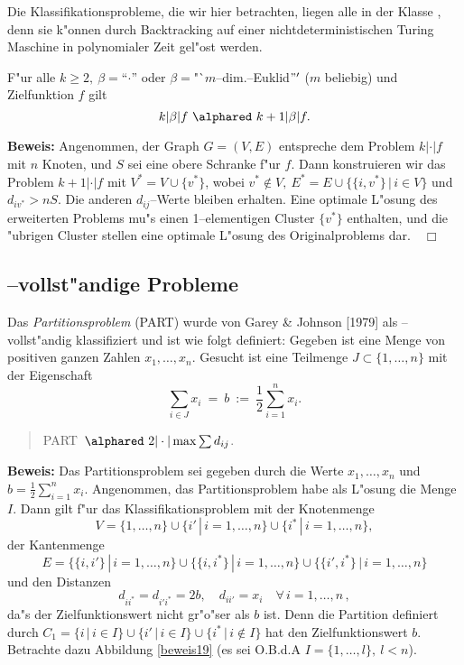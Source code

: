 Die Klassifikationsprobleme, die wir hier betrachten, liegen alle in der
Klasse \NP, denn sie k"onnen durch Backtracking auf
einer nichtdeterministischen Turing Maschine in  polynomialer Zeit
gel"ost werden.

\begin{satz}
	F"ur alle $k \geq 2, \ \beta =$"`$\cdot$"' oder 
	$\beta=$"`$m$--dim.--Euklid$"'$ ($m$ beliebig) und Zielfunktion $f$ gilt
		\[  k | \beta |f \ \alphared\  k+1|\beta|f. \]
\end{satz}
{\bf Beweis:}
Angenommen, der Graph $G=(V,E)$ entspreche dem Problem $k|\cdot|f$ mit
$n$ Knoten, und $S$ sei eine obere Schranke f"ur $f$. Dann konstruieren
wir das Problem $k+1 | \cdot | f$ mit $V^* = V \cup \{v^*\}$, wobei
$v^* \not\in V,\  E^* = E \cup \{\{i,v^*\} \, | \, i \in V\}$ und 
$d_{iv^*} > nS$. Die anderen $d_{ij}$--Werte bleiben erhalten.
Eine optimale L"osung des erweiterten Problems mu"s einen 1--elementigen
Cluster $\{v^*\}$ enthalten, und die "ubrigen Cluster stellen eine
optimale L"osung des Originalproblems dar.$\quad\Box$
\vspace*{0.5cm}

\subsection{\NP--vollst"andige Probleme}
Das {\em Partitionsproblem} (PART) wurde von Garey \& Johnson [1979] als
\NP--vollst"andig klassifiziert und ist wie folgt definiert: Gegeben ist eine
Menge von positiven ganzen Zahlen $x_1,\dots,x_n$. Gesucht ist eine
Teilmenge $J \subset \{1,\dots,n\}$ mit der Eigenschaft
\[ \sum_{i \in J} x_i \ = \ b \ := \ \frac12 \sum_{i=1}^n x_i.\]


\begin{satz}
\label{satz19}
	\begin{quote}
		PART\ $\alphared \ 2 |\cdot|\max\sum d_{ij}$.
	\end{quote}
\end{satz}
{\bf Beweis:}
Das Partitionsproblem sei gegeben durch die Werte $x_1,\dots,x_n$ 
und $b=\frac12 \sum_{i=1}^n x_i$. Angenommen, das Partitionsproblem habe
als L"osung die Menge $I$. Dann gilt f"ur das Klassifikationsproblem mit
der Knotenmenge
\[ V = \{1,\dots,n\} \cup \{ i' \, | \, i = 1,\dots,n \} \cup
	\{ i^* \, | \, i = 1,\dots,n\}, \]
der Kantenmenge
\[ 	E = \{ \{i,i'\} \, | \, i = 1,\dots,n\} \cup \{\{i,i^*\}\,|\,i=1,\dots,n\}
	\cup \{\{i',i^*\} \, | \, i = 1,\dots,n\} \]
und den Distanzen
\[ d_{ii^*} = d_{i'i^*} = 2b, \quad d_{ii'} = x_i \quad\forall\, 
	i=1,\dots,n\,,\]
da"s der Zielfunktionswert nicht gr"o"ser als $b$ ist.
Denn die Partition definiert durch
$C_1 = \{ i \, | \, i \in I\} \cup \{i' \, | \, i \in I \}
\cup \{i^* \, | \, i \not\in I\}$ hat den Zielfunktionswert $b$.
Betrachte dazu Abbildung \ref{beweis19} 
(es sei O.B.d.A $I = \{1,\dots,l\},\ l<n$).

